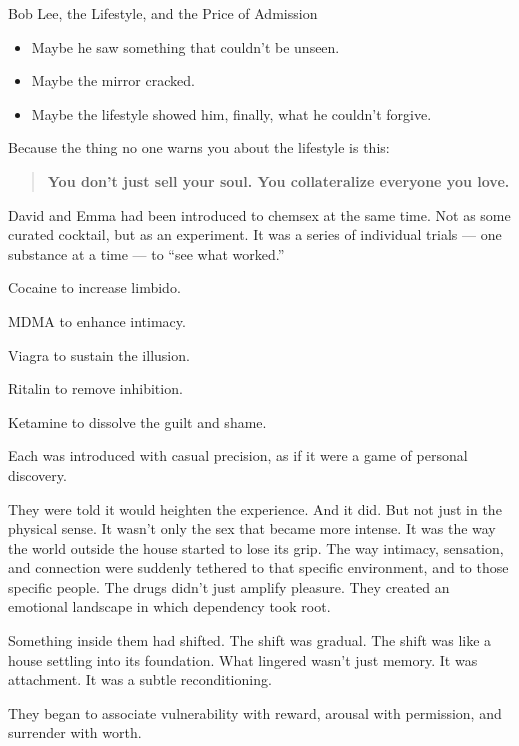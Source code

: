 \begin{HistoricalSidebar}{Bob Lee, the Lifestyle, and the Price of Admission}
  \medskip
  
  \begin{itemize}
    \item Maybe he saw something that couldn’t be unseen.
    \item Maybe the mirror cracked.
    \item Maybe the lifestyle showed him, finally,  what he couldn’t forgive.
  \end{itemize}

  \medskip
  
  Because the thing no one warns you about the lifestyle is this: 

  \begin{quote}
    \textbf{You don’t just sell your soul.  You collateralize everyone you love.}
  \end{quote}
  
\end{HistoricalSidebar}

\medskip

David and Emma had been introduced to chemsex at the same time. Not as some curated cocktail, but as an experiment. 
It was a series of individual trials --- one substance at a time --- to ``see what worked.'' 

Cocaine to increase limbido. 

MDMA to enhance intimacy. 

Viagra to sustain the illusion. 

Ritalin to remove inhibition. 

Ketamine to dissolve the guilt and shame. 

Each was introduced with casual precision, as if it were a game of personal discovery.

They were told it would heighten the experience. And it did. But not just in the physical sense. It wasn’t only 
the sex that became more intense. It was the way the world outside the house started to lose its grip. 
The way intimacy, sensation, and connection were suddenly tethered to that specific environment, and to those 
specific people. The drugs didn’t just amplify pleasure. They created an emotional landscape in which 
dependency took root.

Something inside them had shifted. The shift was gradual. The shift was like a house settling into its foundation. 
What lingered wasn’t just memory. It was attachment. It was a subtle reconditioning. 

They began to associate vulnerability with reward, arousal with permission, and surrender with worth.

